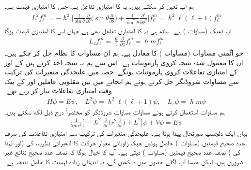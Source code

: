 ہم اب  تعین کر سکتے ہیں۔ یہ  کا امتیازی تفاعل ہے، جس کا امتیازی قیمت  ہے۔
\begin{align*}
L^2 f_{\ell}^m = - \hslash^2 \big [ \frac{1}{\sin \theta} \frac{\partial}{\partial \theta} \big ( \sin \theta \frac{\partial}{\partial \theta} \big ) + \frac{1}{\sin^2 \theta} \frac{\partial^2}{\partial \phi^2} \big ] f_{\ell}^m = \hslash^2 \ell (\ell + 1) f_{\ell}^m
\end{align*}
یہ ٹھیک (مساوات ) ہے۔ ساتھ ہی یہ  کا امتیازی تفاعل بھی ہے جہاں اس کا امتیازی قیمت  ہوگا: 
\begin{align*}
L_z f_{\ell}^m = \frac{\hslash}{i} \frac{\partial}{\partial \phi} f_{\ell}^m = \hslash m f_{\ell}^m
\end{align*}
جو اثّمتی مساوات (مساوات ) کا معادل ہے۔ ہم ان مساوات کا نظام حل کر چکے ہیں۔ ان کا معمول شدہ نتیجہ کروی ہارمونیات  ہے۔ اس سے ہم یہ نتیجہ اخذ کرتے ہیں کے  اور  کے امتیازی تفاعلات کروی ہارمونیات ہونگے. حصہ  میں علیحدگی متغیرات کی ترکیب سے مساوات شروڈنگر حل کرتے ہوئے ہم انجانے میں تین مقلوبی عاملین   اور  کے بیک وقت امتیازی تفاعلات تیار کر رہے تھے۔ 
\begin{align}
H \psi = E \psi , \quad L^2 \psi = \hslash^2 \ell (\ell + 1) \psi , \quad L_z \psi = \hslash m \psi
\end{align}
ہم مساوات  استعمال کرتے ہوئے مساوات مساوات شروڈنگر کو مختصراً درج ذیل لکھ سکتے ہیں۔ 
\begin{align*}
\frac{1}{2m r^2} \big [ - \hslash^2 \frac{\partial}{\partial r} \big ( r^2 \frac{\partial}{\partial r} \big ) + L^2 \big ] \psi + V \psi = E \psi
\end{align*}
یہاں ایک دلچسپ صورتحال پیدا ہوتا ہے۔ علیحدگی متغیرات کی ترکیب سے امتیازی تفاعلات کی صرف عدد صحیح  قیمتیں (مساوات ) حاصل ہوئیں جبکہ زاویائی معیار حرکت کا الجبرائی نظریہ،  کی (اور لہٰذا  کی ) نصف عدد صحیح قیمتیں (مساوات ) دیتی ہے۔ آپ کا خیال ہوگا کہ نصف عدد صحیح نتائج غیر ضروری ہیں، لیکن جیسا آپ اگلے حصوں میں دیکھیں گے، یہ انتہائی زیادہ اہمیت کا حامل نتیجہ ہے۔ 

